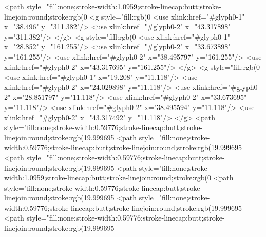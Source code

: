 <path style="fill:none;stroke-width:1.0959;stroke-linecap:butt;stroke-linejoin:round;stroke:rgb(0%
<g style="fill:rgb(0%
  <use xlink:href="#glyph0-1" x="38.496" y="311.382"/>
  <use xlink:href="#glyph0-2" x="43.317898" y="311.382"/>
</g>
<g style="fill:rgb(0%
  <use xlink:href="#glyph0-1" x="28.852" y="161.255"/>
  <use xlink:href="#glyph0-2" x="33.673898" y="161.255"/>
  <use xlink:href="#glyph0-2" x="38.495797" y="161.255"/>
  <use xlink:href="#glyph0-2" x="43.317695" y="161.255"/>
</g>
<g style="fill:rgb(0%
  <use xlink:href="#glyph0-1" x="19.208" y="11.118"/>
  <use xlink:href="#glyph0-2" x="24.029898" y="11.118"/>
  <use xlink:href="#glyph0-2" x="28.851797" y="11.118"/>
  <use xlink:href="#glyph0-2" x="33.673695" y="11.118"/>
  <use xlink:href="#glyph0-2" x="38.495594" y="11.118"/>
  <use xlink:href="#glyph0-2" x="43.317492" y="11.118"/>
</g>
<path style="fill:none;stroke-width:0.59776;stroke-linecap:butt;stroke-linejoin:round;stroke:rgb(19.999695%
<path style="fill:none;stroke-width:0.59776;stroke-linecap:butt;stroke-linejoin:round;stroke:rgb(19.999695%
<path style="fill:none;stroke-width:0.59776;stroke-linecap:butt;stroke-linejoin:round;stroke:rgb(19.999695%
<path style="fill:none;stroke-width:1.0959;stroke-linecap:butt;stroke-linejoin:round;stroke:rgb(0%
<path style="fill:none;stroke-width:0.59776;stroke-linecap:butt;stroke-linejoin:round;stroke:rgb(19.999695%
<path style="fill:none;stroke-width:0.59776;stroke-linecap:butt;stroke-linejoin:round;stroke:rgb(19.999695%
<path style="fill:none;stroke-width:0.59776;stroke-linecap:butt;stroke-linejoin:round;stroke:rgb(19.999695%
